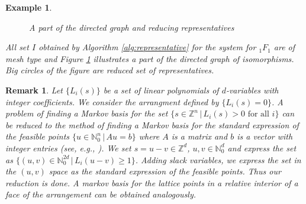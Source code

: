 \documentclass{article}
\def\NN{\mathbb{N}}
\def\ZZ{\mathbb{Z}}
\newtheorem{example}{Example}
\newtheorem{remark}{Remark}
\begin{document}
\begin{example}
\begin{figure}[tb]
\begin{center}
\end{center}
\caption{A part of the directed graph and reducing representatives}
\label{fig:directed-graph-1F1}
\end{figure}

All set $I$ obtained by Algorithm \ref{alg:representative} for the system for ${}_1F_1$ are of mesh type and
Figure \ref{fig:directed-graph-1F1} illustrates a part of the directed graph
of isomorphisms.
Big circles of the figure are reduced set of representatives.
\end{example}


\begin{remark}\rm
Let $\{ L_i(s) \}$ be a set of linear polynomials of $d$-variables 
with integer coefficients.
We consider the arrangment defined by $\{ L_i(s)=0 \}$.
A problem of finding a Markov basis for the set 
$\{ s \in \ZZ^n \,|\, L_i(s) > 0 \mbox{ for all $i$}\}$
can be reduced to the method of finding a Markov basis
for the standard expression of the feasible points
$\{ u \in \NN_0^n \,|\, Au=b \}$
where $A$ is a matrix and $b$ is a vector with integer entries
(see, e.g., \cite{sturmfels-toric}).
We set $s=u-v \in \ZZ^d$, $u,v \in \NN_0^d$
and express the set as $\{ (u,v) \in \NN_0^{2d} \,|\, L_i(u-v) \geq 1 \}$.
Adding slack variables, we express the set in the $(u,v)$ space
as the standard expression of the feasible points.
Thus our reduction is done. 
A markov basis for the lattice points in a relative interior 
of a face of the arrangement can be obtained analogously.
\end{remark}
\end{document}
